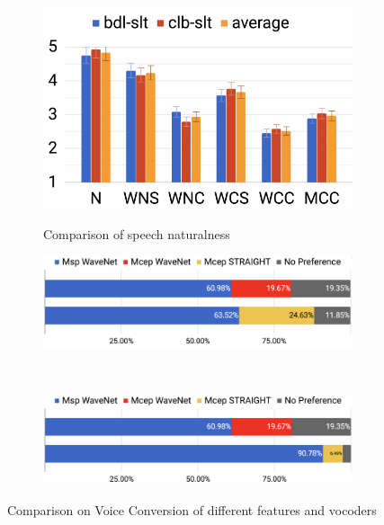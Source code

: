 \begin{figure}[!ht]
    \begin{subfigure}[b]{0.48\linewidth}
        \includegraphics[width=\linewidth,trim=0 0 0 0,clip]{figure/4_wavenetworld4.png}

        {Comparison of speech naturalness}
        \label{fig:wavenetworld4}
    \end{subfigure}
    \hfill
    \begin{minipage}[b]{0.5\linewidth}
        \begin{subfigure}[b]{\linewidth}
            \centering
            \includegraphics[width=0.8\linewidth,trim=0 0 0 0,clip]{figure/4_wavenetworld1.png}
            \label{fig:wavenetworld1}
        \end{subfigure}\\
        \begin{subfigure}[b]{\linewidth}
            \centering
            \includegraphics[width=0.8\linewidth,trim=0 0 0 0,clip]{figure/4_wavenetworld2.png}
            \label{fig:wavenetworld2}
        \end{subfigure}
    \end{minipage}
    {Comparison on Voice Conversion of different features and vocoders}
    \label{fig:wavenetworld}
\end{figure}

